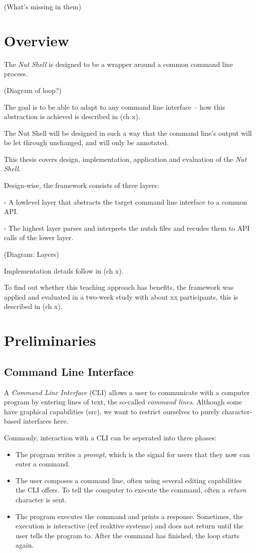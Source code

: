 \documentclass[twoside]{scrreprt}
\begin{document}
(What's missing in them)

\chapter{Overview}

The \emph{Nut Shell} is designed to be a wrapper around a common command line process.

(Diagram of loop?)

The goal is to be able to adapt to any command line interface -- how this abstraction is achieved is described in (ch x).

The Nut Shell will be designed in such a way that the command line's output will be let through unchanged, and will only be annotated.

This thesis covers design, implementation, application and evaluation of the \emph{Nut Shell}.

Design-wise, the framework consists of three layers:

- A lowlevel layer that abstracts the target command line interface to a common API.

- The highest layer parses and interprets the nutsh files and recudes them to API calls of the lower layer.

(Diagram: Layers)

Implementation details follow in (ch x).

To find out whether this teaching approach has benefits, the framework was applied and evaluated in a two-week study with about xx participants, this is described in (ch x).

\chapter{Preliminaries}

\section{Command Line Interface}

A \emph{Command Line Interface} (\textsc{CLI}) allows a user to communicate with a computer program by entering lines of text, the so-called \emph{command lines}. Although some have graphical capabilities (src), we want to restrict ourselves to purely character-based interfaces here.

Commonly, interaction with a \textsc{CLI} can be seperated into three phases:

\begin{itemize}
    \item The program writes a \emph{prompt}, which is the signal for users that they now can enter a command.
    \item The user composes a command line, often using several editing capabilities the CLI offers. To tell the computer to execute the command, often a \emph{return} character is sent.
    \item The program executes the command and prints a response. Sometimes, the execution is interactive (ref reaktive systeme) and does not return until the user tells the program to. After the command has finished, the loop starts again.
\end{itemize}
\end{document}
